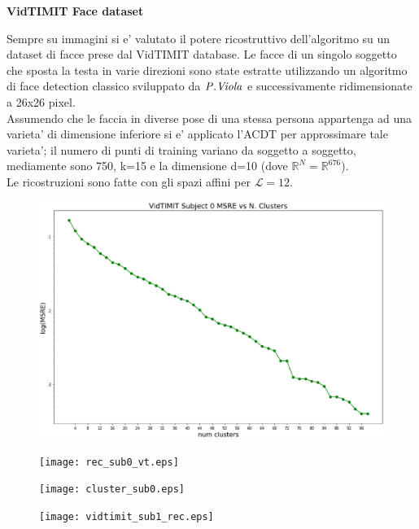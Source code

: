 \documentclass[a4, landscape]{seminar}
\theoremstyle{definition}
\newcommand{\RR}{\mathbb{R}}
\def\bc{\begin{center}}
\def\ec{\end{center}}
\def\bs{\begin{slide}\begingroup\small}
\def\es{\endgroup\end{slide}}
\begin{document}
\bs
\bc{\bf\color{blue}VidTIMIT Face dataset}\ec
Sempre su immagini si e' valutato il potere ricostruttivo dell'algoritmo su un dataset di facce
prese dal VidTIMIT database. Le facce di un singolo soggetto che sposta la testa in varie direzioni sono
state estratte utilizzando un algoritmo di face detection classico sviluppato da $\it{P.Viola}$ e successivamente
ridimensionate a 26x26 pixel. \\
Assumendo che le faccia in diverse pose di una stessa persona appartenga ad una varieta' di dimensione inferiore si e' applicato
l'ACDT per approssimare tale varieta'; il numero di punti di training variano da soggetto a soggetto, mediamente sono 750,
k=15 e la dimensione d=10 (dove $\RR^{N} = \RR^{676}$). \\
Le ricostruzioni sono fatte con gli spazi affini per $\mathcal{L}=12$.
\es

\bs
\begin{figure}[b]
\centering
\includegraphics[width=\textwidth]{vidtimit_msre.eps}
\end{figure}
\es

\bs
\begin{figure}[b]
\centering
\texttt{[image: rec\_sub0\_vt.eps]}
\end{figure}
\es

\bs
\begin{figure}[b]
\centering
\texttt{[image: cluster\_sub0.eps]}
\end{figure}
\es

\bs
\begin{figure}[b]
\centering
\texttt{[image: vidtimit\_sub1\_rec.eps]}
\end{figure}
\es
\end{document}
